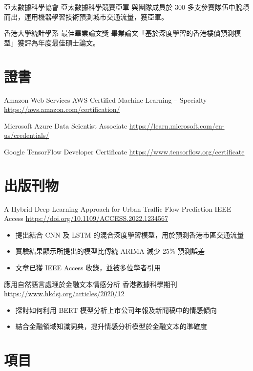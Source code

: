 \documentclass[a4paper, serif, 10pt]{moderncv}
\begin{document}
        {亞太數據科學協會}
        {亞太數據科學競賽亞軍}
        {}
        {}
        {與團隊成員於 300 多支參賽隊伍中脫穎而出，運用機器學習技術預測城市交通流量，獲亞軍。}

        {香港大學統計學系}
        {最佳畢業論文獎}
        {}
        {}
        {畢業論文「基於深度學習的香港樓價預測模型」獲評為年度最佳碩士論文。}
\section{證書}

        {Amazon Web Services}
        {AWS Certified Machine Learning – Specialty}
        {\url{https://aws.amazon.com/certification/}}
        {}
        {}

        {Microsoft}
        {Azure Data Scientist Associate}
        {\url{https://learn.microsoft.com/en-us/credentials/}}
        {}
        {}

        {Google}
        {TensorFlow Developer Certificate}
        {\url{https://www.tensorflow.org/certificate}}
        {}
        {}
\section{出版刊物}

        {A Hybrid Deep Learning Approach for Urban Traffic Flow Prediction}
        {IEEE Access}
        {\url{https://doi.org/10.1109/ACCESS.2022.1234567}}
        {}
        {\begin{itemize}
\item 提出結合 CNN 及 LSTM 的混合深度學習模型，用於預測香港市區交通流量
\item 實驗結果顯示所提出的模型比傳統 ARIMA 減少 25\% 預測誤差
\item 文章已獲 IEEE Access 收錄，並被多位學者引用
\end{itemize}}

        {應用自然語言處理於金融文本情感分析}
        {香港數據科學期刊}
        {\url{https://www.hkdsj.org/articles/2020/12}}
        {}
        {\begin{itemize}
\item 探討如何利用 BERT 模型分析上市公司年報及新聞稿中的情感傾向
\item 結合金融領域知識詞典，提升情感分析模型於金融文本的準確度
\end{itemize}}
\section{項目}
\end{document}
